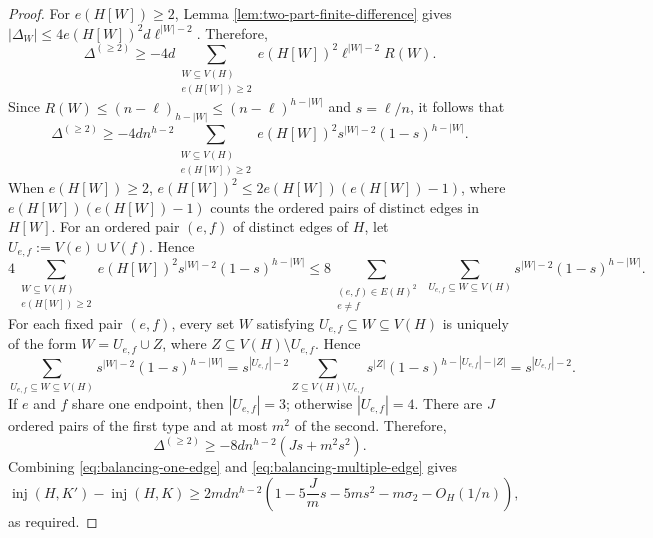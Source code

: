\documentclass[10pt,a4paper]{amsart}
\newcommand{\inj}{\operatorname{inj}}
\begin{document}
\begin{proof}
For $e(H[W])\ge2$, Lemma \ref{lem:two-part-finite-difference} gives $|\Delta_W|\le 4e(H[W])^2d\ell^{|W|-2}$. Therefore,
\[
\Delta^{(\ge2)}
\ge -4d\sum_{\substack{W\subseteq V(H)\\e(H[W])\ge2}}
e(H[W])^2\ell^{|W|-2}R(W).
\]
Since $R(W)\le(n-\ell)_{h-|W|}\le(n-\ell)^{h-|W|}$ and $s=\ell/n$,
it follows that
\[
\Delta^{(\ge2)}
\ge -4dn^{h-2}
\sum_{\substack{W\subseteq V(H)\\e(H[W])\ge2}}
e(H[W])^2s^{|W|-2}(1-s)^{h-|W|}.
\]
When $e(H[W])\ge2$, $e(H[W])^2\le2e(H[W])(e(H[W])-1)$, where $e(H[W])(e(H[W])-1)$ counts the ordered pairs of distinct edges in $H[W]$. For an ordered pair $(e,f)$ of distinct edges of $H$, let $U_{e,f}:=V(e)\cup V(f)$. Hence
\[
4\sum_{\substack{W\subseteq V(H)\\e(H[W])\ge2}}e(H[W])^2s^{|W|-2}(1-s)^{h-|W|}
\le 8\sum_{\substack{(e,f)\in E(H)^2\\e\ne f}}\ \sum_{U_{e,f}\subseteq W\subseteq V(H)}s^{|W|-2}(1-s)^{h-|W|}.
\]
For each fixed pair $(e,f)$, every set $W$ satisfying $U_{e,f}\subseteq W\subseteq V(H)$ is uniquely of the form $W=U_{e,f}\cup Z$, where $Z\subseteq V(H)\setminus U_{e,f}$. Hence
\[
\sum_{U_{e,f}\subseteq W\subseteq V(H)}s^{|W|-2}(1-s)^{h-|W|}
=s^{|U_{e,f}|-2}\sum_{Z\subseteq V(H)\setminus U_{e,f}}s^{|Z|}(1-s)^{h-|U_{e,f}|-|Z|}
=s^{|U_{e,f}|-2}.
\]
If $e$ and $f$ share one endpoint, then $|U_{e,f}|=3$; otherwise $|U_{e,f}|=4$. There are $J$ ordered pairs of the first type and at most $m^2$ of the second. Therefore,
\begin{equation}
\label{eq:balancing-multiple-edge}
\Delta^{(\ge2)}\ge -8dn^{h-2}(Js+m^2s^2).
\end{equation}
Combining \eqref{eq:balancing-one-edge} and \eqref{eq:balancing-multiple-edge} gives
\[
\inj(H,K')-\inj(H,K)
\ge2mdn^{h-2}
\left(1-5\frac{J}{m}s-5ms^2-m\sigma_2-O_H(1/n)\right),
\]
as required.
\end{proof}
\end{document}
